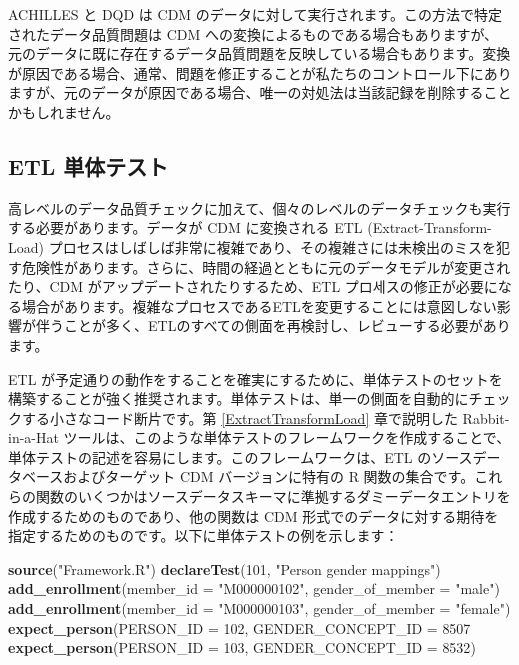 \documentclass[
  11pt]{book}
\makeatletter
\newenvironment{Shaded}{\begin{snugshade}}{\end{snugshade}}
\newcommand{\AttributeTok}[1]{\textcolor[rgb]{0.13,0.29,0.53}{#1}}
\newcommand{\DecValTok}[1]{\textcolor[rgb]{0.00,0.00,0.81}{#1}}
\newcommand{\FunctionTok}[1]{\textcolor[rgb]{0.13,0.29,0.53}{\textbf{#1}}}
\newcommand{\NormalTok}[1]{#1}
\newcommand{\StringTok}[1]{\textcolor[rgb]{0.31,0.60,0.02}{#1}}
\newenvironment{kframe}{%
\medskip{}
\setlength{\fboxsep}{.8em}
 \def\at@end@of@kframe{}%
 \ifinner\ifhmode%
  \def\at@end@of@kframe{\end{minipage}}%
  \begin{minipage}{\columnwidth}%
 \fi\fi%
 \def\FrameCommand##1{\hskip\@totalleftmargin \hskip-\fboxsep
 \colorbox{myShadeColor}{##1}\hskip-\fboxsep
     \hskip-\linewidth \hskip-\@totalleftmargin \hskip\columnwidth}%
 \MakeFramed {\advance\hsize-\width
   \@totalleftmargin\z@ \linewidth\hsize
   \@setminipage}}%
 {\par\unskip\endMakeFramed%
 \at@end@of@kframe}
\newenvironment{rmdblock}[1]
  {
  \begin{itemize}
  \renewcommand{\labelitemi}{
    \raisebox{-.7\height}[0pt][0pt]{
      {\setkeys{Gin}{width=3em,keepaspectratio}\texttt{[image: images/\#1]}}
    }
  }
  \setlength{\fboxsep}{1em}
  \begin{kframe}
  \item
  }
  {
  \end{kframe}
  \end{itemize}
  }
\newenvironment{rmdimportant}
  {\begin{rmdblock}{important}}
  {\end{rmdblock}}
\theoremstyle{definition}
\theoremstyle{definition}
\theoremstyle{definition}
\theoremstyle{definition}
\theoremstyle{remark}
\makeatother
\begin{document}
\begin{rmdimportant}
ACHILLES と DQD は CDM のデータに対して実行されます。この方法で特定されたデータ品質問題は CDM への変換によるものである場合もありますが、元のデータに既に存在するデータ品質問題を反映している場合もあります。変換が原因である場合、通常、問題を修正することが私たちのコントロール下にありますが、元のデータが原因である場合、唯一の対処法は当該記録を削除することかもしれません。
\end{rmdimportant}

\subsection{ETL 単体テスト}\label{etlUnitTests}


高レベルのデータ品質チェックに加えて、個々のレベルのデータチェックも実行する必要があります。データが CDM に変換される ETL (Extract-Transform-Load) プロセスはしばしば非常に複雑であり、その複雑さには未検出のミスを犯す危険性があります。さらに、時間の経過とともに元のデータモデルが変更されたり、CDM がアップデートされたりするため、ETL プロ세スの修正が必要になる場合があります。複雑なプロセスであるETLを変更することには意図しない影響が伴うことが多く、ETLのすべての側面を再検討し、レビューする必要があります。

ETL が予定通りの動作をすることを確実にするために、単体テストのセットを構築することが強く推奨されます。単体テストは、単一の側面を自動的にチェックする小さなコード断片です。第 \ref{ExtractTransformLoad} 章で説明した Rabbit-in-a-Hat ツールは、このような単体テストのフレームワークを作成することで、単体テストの記述を容易にします。このフレームワークは、ETL のソースデータベースおよびターゲット CDM バージョンに特有の R 関数の集合です。これらの関数のいくつかはソースデータスキーマに準拠するダミーデータエントリを作成するためのものであり、他の関数は CDM 形式でのデータに対する期待を指定するためのものです。以下に単体テストの例を示します：

\begin{Shaded}
\begin{Highlighting}[]
\FunctionTok{source}\NormalTok{(}\StringTok{"Framework.R"}\NormalTok{)}
\FunctionTok{declareTest}\NormalTok{(}\DecValTok{101}\NormalTok{, }\StringTok{"Person gender mappings"}\NormalTok{)}
\FunctionTok{add\_enrollment}\NormalTok{(}\AttributeTok{member\_id =} \StringTok{"M000000102"}\NormalTok{, }\AttributeTok{gender\_of\_member =} \StringTok{"male"}\NormalTok{)}
\FunctionTok{add\_enrollment}\NormalTok{(}\AttributeTok{member\_id =} \StringTok{"M000000103"}\NormalTok{, }\AttributeTok{gender\_of\_member =} \StringTok{"female"}\NormalTok{)}
\FunctionTok{expect\_person}\NormalTok{(}\AttributeTok{PERSON\_ID =} \DecValTok{102}\NormalTok{, }\AttributeTok{GENDER\_CONCEPT\_ID =} \DecValTok{8507}
\FunctionTok{expect\_person}\NormalTok{(}\AttributeTok{PERSON\_ID =} \DecValTok{103}\NormalTok{, }\AttributeTok{GENDER\_CONCEPT\_ID =} \DecValTok{8532}\NormalTok{)}
\end{Highlighting}
\end{Shaded}
\end{document}
